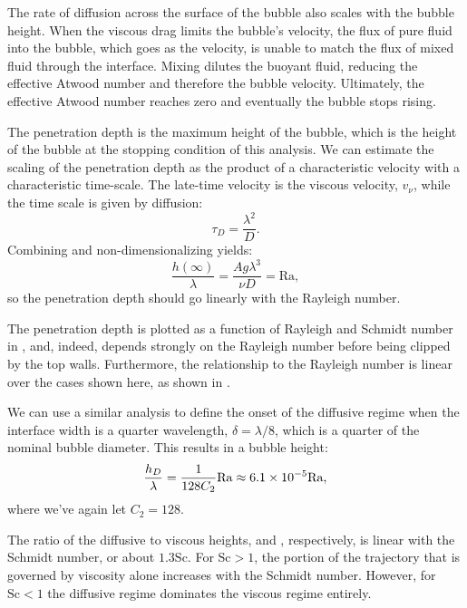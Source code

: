 The rate of diffusion across the surface of the bubble also scales with the bubble height.
When the viscous drag limits the bubble's velocity, the flux of pure fluid into the bubble, which goes as the velocity, is unable to match the flux of mixed fluid through the interface.
Mixing dilutes the buoyant fluid, reducing the effective Atwood number and therefore the bubble velocity.
Ultimately, the effective Atwood number reaches zero and eventually the bubble stops rising.

The penetration depth is the maximum height of the bubble, which is the height of the bubble at the stopping condition of this analysis.
We can estimate the scaling of the penetration depth as the product of a characteristic velocity with a characteristic time-scale.
The late-time velocity is the viscous velocity, $v_\nu$, while the time scale is given by diffusion:
\begin{equation}
\tau_D = \frac{\lambda^2}{D}.
\end{equation}
Combining and non-dimensionalizing yields:
\begin{equation}
\frac{h(\infty)}{\lambda} = \frac{A g \lambda^3}{\nu D} = \text{Ra},
\end{equation}
so the penetration depth should go linearly with the Rayleigh number.

The penetration depth is plotted as a function of Rayleigh and Schmidt number in , and, indeed, depends strongly on the Rayleigh number before being clipped by the top walls.
Furthermore, the relationship to the Rayleigh number is linear over the cases shown here, as shown in .

We can use a similar analysis to define the onset of the diffusive regime when the interface width is a quarter wavelength, $\delta = \lambda / 8$, which is a quarter of the nominal bubble diameter.
This results in a bubble height:
\begin{equation} \elabel{diff_height}
\frac{h_D}{\lambda} = \frac{1}{128 C_2} \text{Ra} \approx 6.1 \times 10^{-5} \text{Ra},
\end{equation}
where we've again let $C_2 = 128$.

The ratio of the diffusive to viscous heights,  and , respectively, is linear with the Schmidt number, or about $1.3 \text{Sc}$.
For $\text{Sc} > 1$, the portion of the trajectory that is governed by viscosity alone increases with the Schmidt number.
However, for $\text{Sc} < 1$ the diffusive regime dominates the viscous regime entirely.

